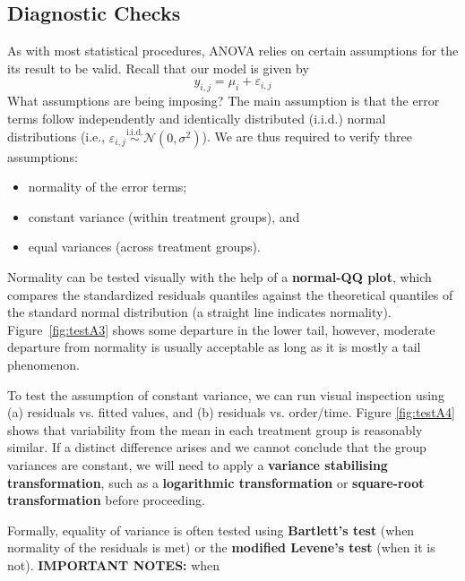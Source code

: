 \subsection{Diagnostic Checks}
As with most statistical procedures, ANOVA relies on certain assumptions for the its result to be valid. Recall that our model is given by
\begin{equation*}
    y_{i,j}=\mu_{i}+\varepsilon_{i,j}
\end{equation*}
What assumptions are being imposing? The main assumption is that the error terms follow independently and identically distributed ({i.i.d.}) normal distributions (i.e., $\varepsilon_{i,j}\stackrel{\text{i.i.d.}}{\sim}\mathcal{N}(0,\sigma^{2})$). We are thus required to verify three assumptions:
\begin{itemize}[noitemsep]
    \item normality of the error terms;
    \item constant variance (within treatment groups), and
    \item equal variances (across treatment groups).
\end{itemize}
Normality can be tested visually with the help of a \textbf{normal-QQ plot}, which compares the standardized residuals quantiles against the theoretical quantiles of the standard normal distribution (a straight line indicates normality). Figure~\ref{fig:testA3} shows some departure in the lower tail, however, moderate departure from normality is usually acceptable as long as it is mostly a tail phenomenon.
\par To test the assumption of constant variance, we can run visual inspection using  (a) residuals vs. fitted values, and (b) residuals vs. order/time. Figure \ref{fig:testA4} shows that variability from the mean in each treatment group is reasonably similar. If a distinct difference arises and we cannot conclude that the group variances are constant, we will need to apply a \textbf{variance stabilising transformation}, such as a \textbf{logarithmic transformation} or \textbf{square-root transformation} before proceeding. \par Formally, equality of variance is often tested using \textbf{Bartlett's test} (when normality of the residuals is met) or the \textbf{modified Levene's test} (when it is not). \newpage\noindent \textbf{IMPORTANT NOTES:} when
